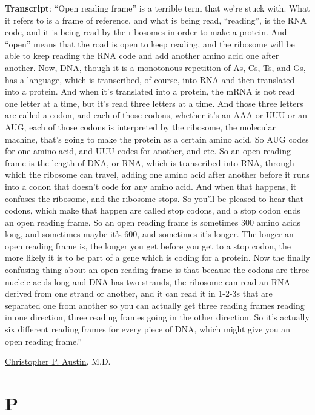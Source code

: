 \documentclass[
]{book}
\begin{document}
\textbf{Transcript}: ``Open reading frame'' is a terrible term that we're stuck with. What it refers to is a frame of reference, and what is being read, ``reading'', is the RNA code, and it is being read by the ribosomes in order to make a protein. And ``open'' means that the road is open to keep reading, and the ribosome will be able to keep reading the RNA code and add another amino acid one after another. Now, DNA, though it is a monotonous repetition of As, Cs, Ts, and Gs, has a language, which is transcribed, of course, into RNA and then translated into a protein. And when it's translated into a protein, the mRNA is not read one letter at a time, but it's read three letters at a time. And those three letters are called a codon, and each of those codons, whether it's an AAA or UUU or an AUG, each of those codons is interpreted by the ribosome, the molecular machine, that's going to make the protein as a certain amino acid. So AUG codes for one amino acid, and UUU codes for another, and etc. So an open reading frame is the length of DNA, or RNA, which is transcribed into RNA, through which the ribosome can travel, adding one amino acid after another before it runs into a codon that doesn't code for any amino acid. And when that happens, it confuses the ribosome, and the ribosome stops. So you'll be pleased to hear that codons, which make that happen are called stop codons, and a stop codon ends an open reading frame. So an open reading frame is sometimes 300 amino acids long, and sometimes maybe it's 600, and sometimes it's longer. The longer an open reading frame is, the longer you get before you get to a stop codon, the more likely it is to be part of a gene which is coding for a protein. Now the finally confusing thing about an open reading frame is that because the codons are three nucleic acids long and DNA has two strands, the ribosome can read an RNA derived from one strand or another, and it can read it in 1-2-3s that are separated one from another so you can actually get three reading frames reading in one direction, three reading frames going in the other direction. So it's actually six different reading frames for every piece of DNA, which might give you an open reading frame.''

\href{https://www.nih.gov/about-nih/who-we-are/nih-director/statements/nih-statement-departure-dr-christopher-austin}{Christopher P. Austin}, M.D.

\hypertarget{p}{%
\chapter{P}\label{p}}
\end{document}
